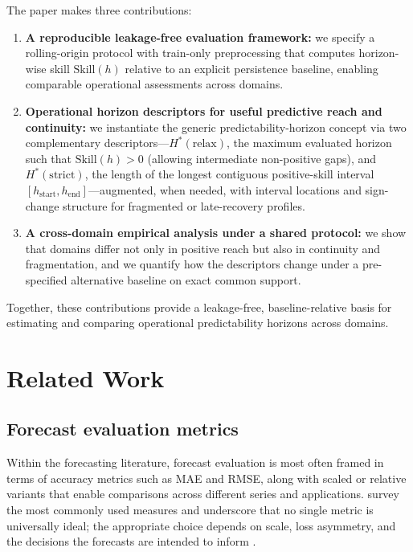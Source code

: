 \documentclass[pdflatex]{sn-jnl}
\begin{document}
The paper makes three contributions:
\begin{enumerate}
  \item \textbf{A reproducible leakage-free evaluation framework:} we specify a rolling-origin protocol with train-only preprocessing that computes horizon-wise skill $\mathrm{Skill}(h)$ relative to an explicit persistence baseline, enabling comparable operational assessments across domains.
  \item \textbf{Operational horizon descriptors for useful predictive reach and continuity:} we instantiate the generic predictability-horizon concept via two complementary descriptors—$H^*(\mathrm{relax})$, the maximum evaluated horizon such that $\mathrm{Skill}(h)>0$ (allowing intermediate non-positive gaps), and $H^*(\mathrm{strict})$, the length of the longest contiguous positive-skill interval $[h_{\mathrm{start}},h_{\mathrm{end}}]$—augmented, when needed, with interval locations and sign-change structure for fragmented or late-recovery profiles.
  \item \textbf{A cross-domain empirical analysis under a shared protocol:} we show that domains differ not only in positive reach but also in continuity and fragmentation, and we quantify how the descriptors change under a pre-specified alternative baseline on exact common support.
\end{enumerate}

Together, these contributions provide a leakage-free, baseline-relative basis for estimating and comparing operational predictability horizons across domains.


\section{Related Work}

\subsection{Forecast evaluation metrics}

Within the forecasting literature, forecast evaluation is most often framed in terms of
accuracy metrics such as MAE and RMSE, along with scaled or relative variants that enable
comparisons across different series and applications. \citet{hyndman2006} survey
the most commonly used measures and underscore that no single metric is universally ideal;
the appropriate choice depends on scale, loss asymmetry, and the decisions the forecasts are
intended to inform \citep{petropoulos2022}.
\end{document}
